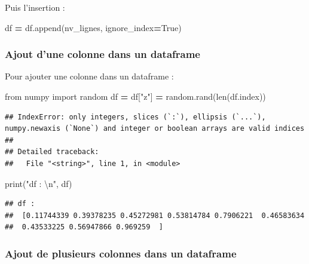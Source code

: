 \documentclass[12pt,]{book}
\newenvironment{Shaded}{\begin{snugshade}}{\end{snugshade}}
\newcommand{\CharTok}[1]{\textcolor[rgb]{0.31,0.60,0.02}{#1}}
\newcommand{\StringTok}[1]{\textcolor[rgb]{0.31,0.60,0.02}{#1}}
\newcommand{\ImportTok}[1]{#1}
\newcommand{\VariableTok}[1]{\textcolor[rgb]{0.00,0.00,0.00}{#1}}
\newcommand{\OperatorTok}[1]{\textcolor[rgb]{0.81,0.36,0.00}{\textbf{#1}}}
\newcommand{\BuiltInTok}[1]{#1}
\newcommand{\NormalTok}[1]{#1}
\numberwithin{equation}{section}
\numberwithin{countremarque}{section}
\begin{document}
Puis l'insertion :

\begin{Shaded}
\begin{Highlighting}[]
\NormalTok{df }\OperatorTok{=}\NormalTok{ df.append(nv_lignes, ignore_index}\OperatorTok{=}\VariableTok{True}\NormalTok{)}
\end{Highlighting}
\end{Shaded}

\subsubsection{Ajout d'une colonne dans un
dataframe}\label{ajout-dune-colonne-dans-un-dataframe}

Pour ajouter une colonne dans un dataframe :

\begin{Shaded}
\begin{Highlighting}[]
\ImportTok{from}\NormalTok{ numpy }\ImportTok{import}\NormalTok{ random}
\NormalTok{df }\OperatorTok{=}\NormalTok{ df[}\StringTok{"z"}\NormalTok{] }\OperatorTok{=}\NormalTok{ random.rand(}\BuiltInTok{len}\NormalTok{(df.index))}
\end{Highlighting}
\end{Shaded}

\begin{lstlisting}
## IndexError: only integers, slices (`:`), ellipsis (`...`), numpy.newaxis (`None`) and integer or boolean arrays are valid indices
## 
## Detailed traceback: 
##   File "<string>", line 1, in <module>
\end{lstlisting}

\begin{Shaded}
\begin{Highlighting}[]
\BuiltInTok{print}\NormalTok{(}\StringTok{"df : }\CharTok{\textbackslash{}n}\StringTok{"}\NormalTok{, df)}
\end{Highlighting}
\end{Shaded}

\begin{lstlisting}
## df : 
##  [0.11744339 0.39378235 0.45272981 0.53814784 0.7906221  0.46583634
##  0.43533225 0.56947866 0.969259  ]
\end{lstlisting}

\subsubsection{Ajout de plusieurs colonnes dans un
dataframe}\label{ajout-de-plusieurs-colonnes-dans-un-dataframe}
\end{document}
